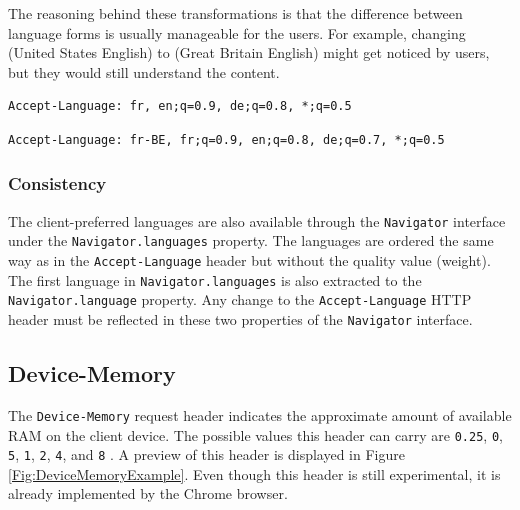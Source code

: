 The reasoning behind these transformations is that the difference between language forms is usually manageable for the users. For example, changing  (United States English) to  (Great Britain English) might get noticed by users, but they would still understand the content.

\bigbreak

\begin{lstlisting}[caption={The result of the \uv{generalization} mode transformation of listing \ref{AcceptLanguageExample}.}, label={AcceptLanguageGeneralization}]
Accept-Language: fr, en;q=0.9, de;q=0.8, *;q=0.5
\end{lstlisting}

\begin{lstlisting}[caption={The result of the \uv{randomization} mode transformation of listing \ref{AcceptLanguageExample}.}, label={AcceptLanguageRandomization}]
Accept-Language: fr-BE, fr;q=0.9, en;q=0.8, de;q=0.7, *;q=0.5
\end{lstlisting}


\subsubsection{Consistency}

The client-preferred languages are also available through the \texttt{Navigator} interface under the \texttt{Navigator.languages} property. The languages are ordered the same way as in the \texttt{Accept-Language} header but without the quality value (weight). The first language in \texttt{Navigator.languages} is also extracted to the \texttt{Navigator.language} property. Any change to the \texttt{Accept-Language} HTTP header must be reflected in these two properties of the \texttt{Navigator} interface.

\subsection{Device-Memory}
\label{SubSection:DeviceMemory}

The \texttt{Device-Memory} request header indicates the approximate amount of available RAM on the client device. The possible values this header can carry are \verb|0.25|, \verb|0|, \verb|5|, \verb|1|, \verb|2|, \verb|4|, and \verb|8| \cite{MDN}. A preview of this header is displayed in Figure \ref{Fig:DeviceMemoryExample}. Even though this header is still experimental, it is already implemented by the Chrome browser.

